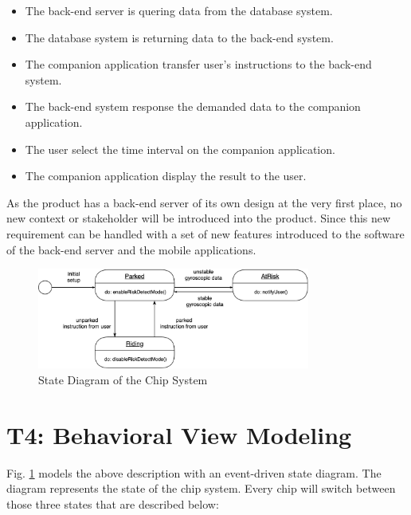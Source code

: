 \documentclass[conference]{IEEEtran}
\begin{document}
\begin{itemize}
	\item [1.] The back-end server is quering data from the database system.
	\item [2.] The database system is returning data to the back-end system.
	\item [3.] The companion application transfer user's instructions to the back-end system.
	\item [4.] The back-end system response the demanded data to the companion application.
	\item [6.] The user select the time interval on the companion application.
	\item [5.] The companion application display the result to the user.
\end{itemize}

As the product has a back-end server of its own design at the very first place, no new context or stakeholder will be introduced into the product.
Since this new requirement can be handled with a set of new features introduced to the software of the back-end server and the mobile applications.

\begin{figure}[!ht]
	\centering
	\includegraphics[width=0.8\textwidth]{./img/state-diagram.png}
	\caption{State Diagram of the Chip System}
	\label{fig:state-diagram}
\end{figure}

\section{T4: Behavioral View Modeling}


Fig. \ref{fig:state-diagram} models the above description with an event-driven state diagram.
The diagram represents the state of the chip system. Every chip will switch between those three states that are described below:
\end{document}
